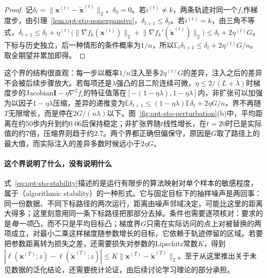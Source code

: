 \begin{proof}
记$\delta_t=\lVert\bm x^{(t)}-\tilde{\bm x}^{(t)}\rVert_2$，$\delta_0=0$。若$i^{(t)}\neq k$，两条轨迹对同一个$f_i$作梯度步，由引理~\ref{lem:opt-sto-nonexpansive}，$\delta_{t+1}\leq\delta_t$。若$i^{(t)}=k$，由三角不等式，$\delta_{t+1}\leq\delta_t+\eta^{(t)}\bigl(\lVert\nabla f_k(\bm x^{(t)})\rVert_2+\lVert\nabla f_k'(\tilde{\bm x}^{(t)})\rVert_2\bigr)\leq\delta_t+2\eta^{(t)}G$。下标与历史独立，后一种情形的条件概率为$1/n$，所以$\mathbb E_t\delta_{t+1}\leq\delta_t+2\eta^{(t)}G/n$。取全期望并累加即得。
\end{proof}

这个界的结构很直观：每一步以概率$1/n$注入至多$2\eta^{(t)}G$的差异，注入之后的差异不会被后续步骤放大。若每项还是$\lambda$强凸的且二阶连续可微，$\eta\leq2/(L+\lambda)$时梯度步的Jacobian$\bm I-\eta\nabla^2f_i$的特征值落在$[-(1-\eta\lambda),1-\eta\lambda]$内，非扩张可以加强为以因子$1-\eta\lambda$压缩，差异的递推变为$\mathbb E\delta_{t+1}\leq(1-\eta\lambda)\mathbb E\delta_t+2\eta G/n$，界不再随$T$无限增长，而是停在$2G/(n\lambda)$以下。图~\ref{fig:opt-sto-perturbation}(b)中，平均距离在约$50$步内升到约$0.06$后保持稳定；非扩张界随$t$线性增长，在$t=20$时已是实际值的约$7$倍，压缩界则趋于约$2.7$。两个界都正确但偏保守，原因是$G$取了路径上的最大值，而实际注入的差异多数时候远小于$2\eta G$。

\paragraph{这个界说明了什么，没有说明什么}
式~\eqref{eq:opt-sto-stability}描述的是运行有限步的算法映射对单个样本的敏感程度，属于（algorithmic stability）的一种形式。它与固定目标下的抽样噪声是两回事：同一份数据、不同下标路径的两次运行，距离由噪声邻域决定，可能比这里的距离大得多；这里刻意用同一条下标路径把那部分去掉。条件也需要逐项核对：要求的是\emph{每一项}凸，而不只是平均目标凸；梯度界$G$只需在实际访问的点上对被替换的两项成立，对最小二乘这样梯度随参数增长的目标，它依赖于轨迹停留的区域。若要把参数距离转为损失之差，还需要损失对参数的Lipschitz常数$K$，得到$|\ell(\bm x^{(T)};z)-\ell(\tilde{\bm x}^{(T)};z)|\leq K\lVert\bm x^{(T)}-\tilde{\bm x}^{(T)}\rVert_2$。至于从这里推出关于未见数据的泛化结论，还需要统计论证，由后续讨论学习理论的部分承担。
